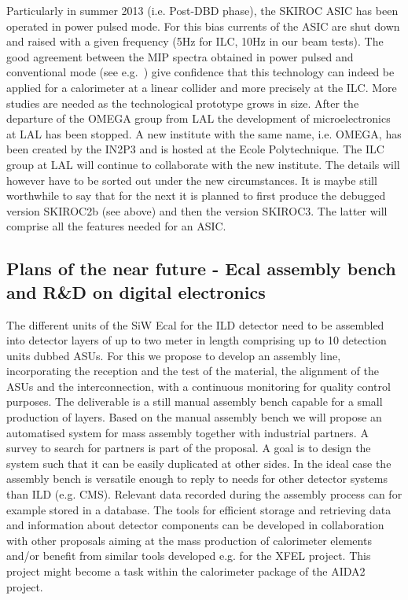 Particularly in summer 2013 (i.e. Post-DBD phase), the SKIROC ASIC has been operated in power pulsed mode. For this bias currents of the ASIC are shut down and raised with a given frequency (5Hz for ILC, 10Hz in our beam tests). The good agreement between the MIP spectra obtained in power pulsed and conventional mode (see e.g.~\cite{Poschl:Giessen:ECAL:2014}) give confidence that this technology can indeed be applied for a calorimeter at a linear collider and more precisely at the ILC. More studies are needed as the technological prototype grows in size.
After the departure of the OMEGA group from LAL the development of microelectronics at LAL has been stopped. A new institute with the same name, i.e. OMEGA, has been created by the IN2P3 and is hosted at the Ecole Polytechnique. The ILC group at LAL will continue to collaborate with the new institute. The details will however have to be sorted out under the new circumstances. It is maybe still worthwhile to say that for the next it is planned to first produce the debugged version SKIROC2b (see above) and then the version SKIROC3. The latter will comprise all the features needed for an ASIC.
\subsection{Plans of the near future - Ecal assembly bench and R\&D on digital electronics}
The different units of the SiW Ecal for the ILD detector need to be assembled into detector layers of up to two meter in length comprising up to 10 detection units dubbed ASUs. For this we propose to develop an assembly line, incorporating the reception and the test of the material, the alignment of the ASUs and the interconnection, with a continuous monitoring for quality control purposes. The deliverable is a still manual assembly bench capable for a small production of layers. Based on the manual assembly bench we will propose an automatised system for mass assembly together with industrial partners. A survey to search for partners is part of the proposal. A goal is to design the system such that it can be easily duplicated at other sides. In the ideal case the assembly bench is versatile enough to reply to needs for other detector systems than ILD (e.g. CMS). Relevant data recorded during the assembly process can for example stored in a database. The tools for efficient storage and retrieving data and information about detector components can be developed in collaboration with other proposals aiming at the mass production of calorimeter elements and/or benefit from similar tools developed e.g. for the XFEL project. This project might become a task within the calorimeter package of the AIDA2 project.

